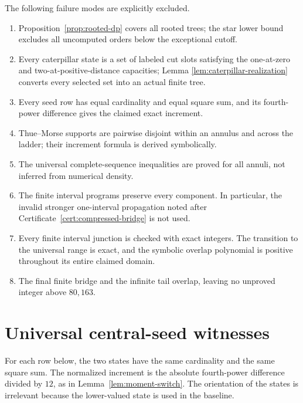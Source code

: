 \documentclass[11pt]{article}
\theoremstyle{definition}
\theoremstyle{remark}
\begin{document}
The following failure modes are explicitly excluded.
\begin{enumerate}[label=(\arabic*)]
\item Proposition~\ref{prop:rooted-dp} covers all rooted trees; the star lower
      bound excludes all uncomputed orders below the exceptional cutoff.
\item Every caterpillar state is a set of labeled cut slots satisfying the
      one-at-zero and two-at-positive-distance capacities; Lemma
      \ref{lem:caterpillar-realization} converts every selected set into an
      actual finite tree.
\item Every seed row has equal cardinality and equal square sum, and its
      fourth-power difference gives the claimed exact increment.
\item Thue--Morse supports are pairwise disjoint within an annulus and across
      the ladder; their increment formula is derived symbolically.
\item The universal complete-sequence inequalities are proved for all annuli,
      not inferred from numerical density.
\item The finite interval programs preserve every component.  In particular,
      the invalid stronger one-interval propagation noted after
      Certificate~\ref{cert:compressed-bridge} is not used.
\item Every finite interval junction is checked with exact integers.  The
      transition to the universal range is exact, and the symbolic overlap
      polynomial is positive throughout its entire claimed domain.
\item The final finite bridge and the infinite tail overlap, leaving no
      unproved integer above $80{,}163$.
\end{enumerate}

\appendix

\section{Universal central-seed witnesses}\label{app:seed-witnesses}

For each row below, the two states have the same cardinality and the same
square sum.  The normalized increment is the absolute fourth-power difference
divided by $12$, as in Lemma~\ref{lem:moment-switch}.  The orientation of the
states is irrelevant because the lower-valued state is used in the baseline.
\end{document}
